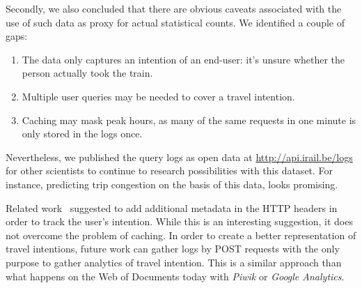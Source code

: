 \documentclass{sig-alternate}
\begin{document}
Secondly, we also concluded that there are obvious caveats associated with the use of such data as proxy for actual statistical counts. 
We identified a couple of gaps:
\begin{enumerate}
  \item The data only captures an intention of an end-user: it's unsure whether the person actually took the train.
  \item Multiple user queries may be needed to cover a travel intention.
  \item Caching may mask peak hours, as many of the same requests in one minute is only stored in the logs once.
\end{enumerate}
Nevertheless, we published the query logs as open data at \url{http://api.irail.be/logs} for other scientists to continue to research possibilities with this dataset.
For instance, predicting trip congestion on the basis of this data, looks promising. %

Related work~\cite{verborgh2014lonesome} suggested to add additional metadata in the HTTP headers in order to track the user's intention.
While this is an interesting suggestion, it does not overcome the problem of caching.
In order to create a better representation of travel intentions, future work can gather logs by POST requests with the only purpose to gather analytics of travel intention.
This is a similar approach than what happens on the Web of Documents today with \emph{Piwik} or \emph{Google Analytics}.

\let\oldsection\section
\renewcommand{\section}[2][1]{\oldsection{#1}\vspace{-3pt}}



\end{document}
